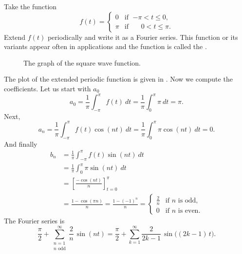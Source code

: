 \begin{example}
Take the function
\begin{equation*}
f(t) =
\begin{cases}
0 & \text{if } \;{-\pi} < t \leq 0 , \\
\pi & \text{if } \;\phantom{-}0 < t \leq \pi .
\end{cases}
\end{equation*}
\nopagebreak[4]%
Extend $f(t)$ periodically and write it 
as a Fourier series.  This function or its variants appear often
in applications and the function is called the
\emph{}.

\begin{figure}[h!t]
\capstart
\begin{center}
\caption{The graph of the square wave function.\label{ts:squarewavefig}}
\end{center}
\end{figure}

The plot of the extended periodic function is given in
.
Now we compute the coefficients.  Let us start with $a_0$
\begin{equation*}
a_0 = \frac{1}{\pi} \int_{-\pi}^\pi f(t) ~dt
= \frac{1}{\pi} \int_{0}^\pi \pi ~dt = \pi .
\end{equation*}
Next,
\begin{equation*}
a_n = \frac{1}{\pi} \int_{-\pi}^\pi f(t) \cos (nt) ~dt 
= \frac{1}{\pi} \int_{0}^\pi \pi \cos (nt) ~dt = 0 .
\end{equation*}
And finally
\begin{equation*}
\begin{split}
b_n & = \frac{1}{\pi} \int_{-\pi}^\pi f(t) \sin (nt) ~dt \\
& = \frac{1}{\pi} \int_{0}^\pi \pi \sin (nt) ~dt \\
& = \left[ \frac{- \cos (nt)}{n} \right]_{t=0}^\pi \\
& = \frac{1 - \cos (\pi n)}{n}
= \frac{1 - {(-1)}^n}{n}
=
\begin{cases}
\frac{2}{n} & \text{if } n \text{ is odd} , \\
0 & \text{if } n \text{ is even} .
\end{cases}
\end{split}
\end{equation*}
The Fourier series is
\begin{equation*}
\frac{\pi}{2} +  \sum_{\substack{n=1\\n \text{ odd}}}^\infty
\frac{2}{n} \,
\sin (n t)
=
\frac{\pi}{2} + \sum_{k=1}^\infty
\frac{2}{2k-1} \,
\sin \bigl( (2k-1)\, t \bigr) .
\end{equation*}


\end{example}
